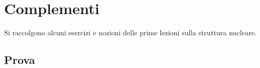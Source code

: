 
\chapter{Complementi}
Si raccolgono alcuni esercizi e nozioni delle prime lezioni sulla struttura nucleare.
\section{Prova}